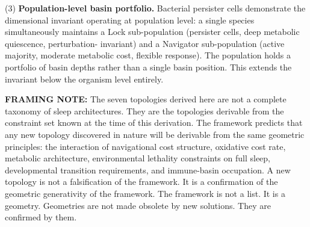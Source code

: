 \documentclass[10pt, a4paper]{article}
\begin{document}
\begin{mdframed}[
  backgroundcolor=derivbox,
  linecolor=headergreen,
  linewidth=0.8pt,
  innertopmargin=0.6em,
  innerbottommargin=0.6em,
  innerleftmargin=0.8em,
  innerrightmargin=0.8em
]
\smallskip
(3) \textbf{Population-level basin
portfolio.} Bacterial persister cells
demonstrate the dimensional invariant
operating at population level: a single
species simultaneously maintains a Lock
sub-population (persister cells, deep
metabolic quiescence, perturbation-
invariant) and a Navigator sub-population
(active majority, moderate metabolic cost,
flexible response). The population holds
a portfolio of basin depths rather than
a single basin position. This extends
the invariant below the organism level
entirely.

\smallskip
\textbf{FRAMING NOTE:} The seven topologies
derived here are not a complete taxonomy
of sleep architectures. They are the
topologies derivable from the constraint
set known at the time of this derivation.
The framework predicts that any new
topology discovered in nature will be
derivable from the same geometric
principles: the interaction of navigational
cost structure, oxidative cost rate,
metabolic architecture, environmental
lethality constraints on full sleep,
developmental transition requirements,
and immune-basin occupation. A new
topology is not a falsification of the
framework. It is a confirmation of the
geometric generativity of the framework.
The framework is not a list.
It is a geometry. Geometries are not
made obsolete by new solutions.
They are confirmed by them.
\end{mdframed}

\vspace{0.8em}
\end{document}
